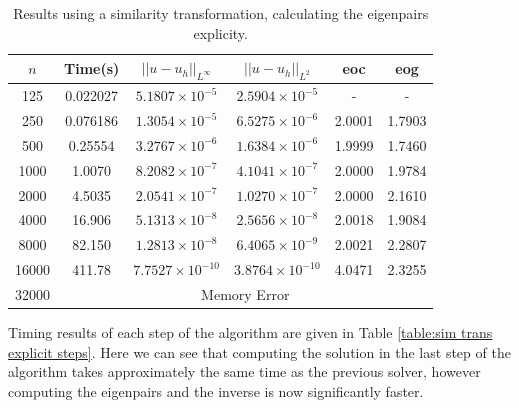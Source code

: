 \documentclass[11pt]{article}
\numberwithin{equation}{section}
\begin{document}
\begin{table}[H]
\centering
\begin{tabular}{|c|c|c|c|c|c|}
\hline
$n$ & Time(s) & $|| u - u_h ||_{L^{\infty}}$ &$|| u - u_h ||_{L^{2}}$ & eoc & eog\\
\hline
125 & 0.022027 & $5.1807 \times 10^{-5}$ & $2.5904 \times 10^{-5}$ & - & -  \\
250 & 0.076186 & $1.3054 \times 10^{-5}$ & $6.5275 \times 10^{-6}$ & 2.0001 & 1.7903  \\
500 & 0.25554 & $3.2767 \times 10^{-6}$ & $1.6384 \times 10^{-6}$ & 1.9999 & 1.7460 \\
1000 & 1.0070 & $8.2082 \times 10^{-7}$ & $4.1041 \times 10^{-7}$ & 2.0000 & 1.9784  \\
2000 & 4.5035 & $2.0541 \times 10^{-7}$ & $1.0270 \times 10^{-7}$ & 2.0000 & 2.1610 \\
4000 & 16.906 & $5.1313 \times 10^{-8}$ & $2.5656 \times 10^{-8}$ & 2.0018 & 1.9084  \\
8000 & 82.150 & $1.2813 \times 10^{-8}$ & $6.4065 \times 10^{-9}$ & 2.0021 & 2.2807  \\
16000 & 411.78 & $7.7527 \times 10^{-10}$ & $3.8764 \times 10^{-10}$ & 4.0471 & 2.3255 \\
\cline{2-6}
32000 & \multicolumn{5}{c|}{Memory Error} \\
\hline
\end{tabular}
\captionsetup{justification=centering}
\caption{Results using a similarity transformation, calculating the eigenpairs explicity.}
\label{table:sim trans explicit}
\end{table}

Timing results of each step of the algorithm are given in Table \ref{table:sim trans explicit steps}. Here we can see that computing the solution in the last step of the algorithm takes approximately the same time as the previous solver, however computing the eigenpairs and the inverse is now significantly faster.
\end{document}
